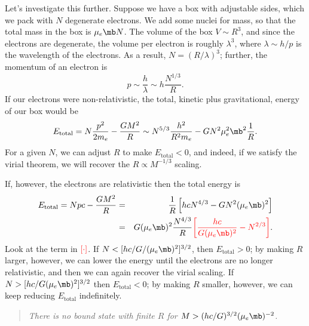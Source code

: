 Let's investigate this further. Suppose we have a box with adjustable sides, which we pack with $N$ degenerate electrons. We add some nuclei for mass, so that the total mass in the box is $\mu_{e}\mb N$. The volume of the box $V \sim R^{3}$, and since the electrons are degenerate, the volume per electron is roughly $\lambda^{3}$, where $\lambda \sim h/p$ is the wavelength of the electrons.  As a result, $N = (R/\lambda)^{3}$; further, the momentum of an electron is
\[	p \sim \frac{h}{\lambda} \sim h\frac{N^{1/3}}{R}. \]
If our electrons were non-relativistic, the total, kinetic plus gravitational, energy of our box would be
\[
	E_{\mathrm{total}} = N\frac{p^{2}}{2m_{e}} - \frac{GM^{2}}{R} \sim N^{5/3}\frac{h^{2}}{R^{2}m_{e}} - GN^{2}\mu_{e}^{2}\mb^{2} \frac{1}{R}.
\]
For a given $N$, we can adjust $R$ to make $E_{\mathrm{total}}<0$, and indeed, if we satisfy the virial theorem, we will recover the $R\propto M^{-1/3}$ scaling.

If, however, the electrons are relativistic then the total energy is
\begin{eqnarray*}
	E_{\mathrm{total}} = Npc - \frac{GM^{2}}{R} 
		&=& \frac{1}{R}\left[hc N^{4/3} - G N^{2}(\mu_{e}\mb)^{2}\right]\\
		&=& G(\mu_{e}\mb)^{2}\frac{N^{4/3}}{R}
		{\color{red}\left[ \frac{hc}{G(\mu_{e}\mb)^{2}} - N^{2/3}\right]}.
\end{eqnarray*}
Look at the term in $\color{red}\left[\cdot\right]$.
If $N < [hc/G/(\mu_{e}\mb)^{2}]^{3/2}$, then $E_{\mathrm{total}} > 0$; by making $R$ larger, however, we can lower the energy until the electrons are no longer relativistic, and then we can again recover the virial scaling.  If $N > [hc/G(\mu_{e}\mb)^{2}]^{3/2}$ then $E_{\mathrm{total}} < 0$; by making $R$ smaller, however, we can keep reducing $E_{\mathrm{total}}$ indefinitely. 
\begin{quote}\itshape
There is no bound state with finite $R$ for $M>(hc/G)^{3/2}(\mu_{e}\mb)^{-2}$.
\end{quote}

